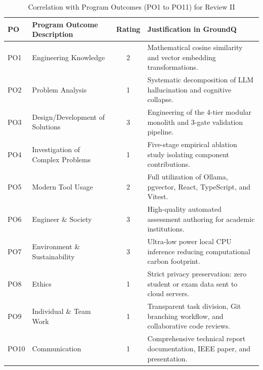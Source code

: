 \documentclass[12pt,a4paper]{report}
\begin{document}
\begin{table}[H]
\centering
\caption{Correlation with Program Outcomes (PO1 to PO11) for Review II}
\label{tab:po_mapping}
\begin{tabularx}{\textwidth}{P{0.12\textwidth} P{0.48\textwidth} c Y}
\toprule
\textbf{PO} & \textbf{Program Outcome Description} & \textbf{Rating} & \textbf{Justification in GroundQ}\\
\midrule
PO1 & Engineering Knowledge & 2 & Mathematical cosine similarity and vector embedding transformations. \\
PO2 & Problem Analysis & 1 & Systematic decomposition of LLM hallucination and cognitive collapse. \\
PO3 & Design/Development of Solutions & 3 & Engineering of the 4-tier modular monolith and 3-gate validation pipeline. \\
PO4 & Investigation of Complex Problems & 1 & Five-stage empirical ablation study isolating component contributions. \\
PO5 & Modern Tool Usage & 2 & Full utilization of Ollama, pgvector, React, TypeScript, and Vitest. \\
PO6 & Engineer \& Society & 3 & High-quality automated assessment authoring for academic institutions. \\
PO7 & Environment \& Sustainability & 3 & Ultra-low power local CPU inference reducing computational carbon footprint. \\
PO8 & Ethics & 1 & Strict privacy preservation: zero student or exam data sent to cloud servers. \\
PO9 & Individual \& Team Work & 1 & Transparent task division, Git branching workflow, and collaborative code reviews. \\
PO10 & Communication & 1 & Comprehensive technical report documentation, IEEE paper, and presentation. \\
\bottomrule
\end{tabularx}
\end{table}
\end{document}
